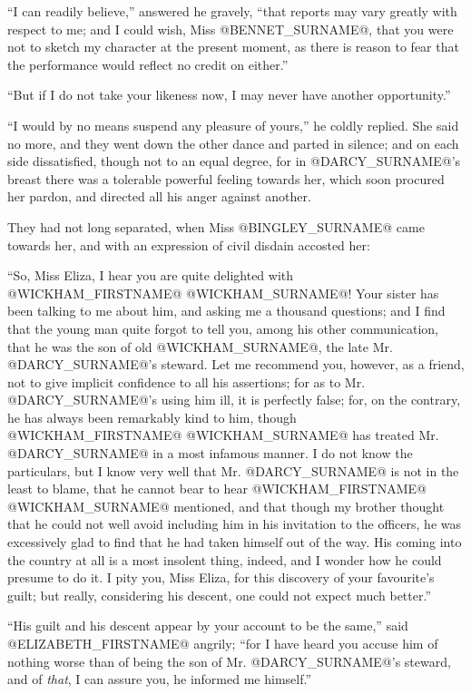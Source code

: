``I can readily believe,'' answered he gravely, ``that reports may vary
greatly with respect to me; and I could wish, Miss @BENNET_SURNAME@, that you were
not to sketch my character at the present moment, as there is reason to
fear that the performance would reflect no credit on either.''

``But if I do not take your likeness now, I may never have another
opportunity.''

``I would by no means suspend any pleasure of yours,'' he coldly replied.
She said no more, and they went down the other dance and parted in
silence; and on each side dissatisfied, though not to an equal degree,
for in @DARCY_SURNAME@'s breast there was a tolerable powerful feeling towards
her, which soon procured her pardon, and directed all his anger against
another.

They had not long separated, when Miss @BINGLEY_SURNAME@ came towards her, and
with an expression of civil disdain accosted her:

``So, Miss Eliza, I hear you are quite delighted with @WICKHAM_FIRSTNAME@ @WICKHAM_SURNAME@!
Your sister has been talking to me about him, and asking me a thousand
questions; and I find that the young man quite forgot to tell you, among
his other communication, that he was the son of old @WICKHAM_SURNAME@, the late
Mr. @DARCY_SURNAME@'s steward. Let me recommend you, however, as a friend, not to
give implicit confidence to all his assertions; for as to Mr. @DARCY_SURNAME@'s
using him ill, it is perfectly false; for, on the contrary, he has
always been remarkably kind to him, though @WICKHAM_FIRSTNAME@ @WICKHAM_SURNAME@ has treated
Mr. @DARCY_SURNAME@ in a most infamous manner. I do not know the particulars, but
I know very well that Mr. @DARCY_SURNAME@ is not in the least to blame, that he
cannot bear to hear @WICKHAM_FIRSTNAME@ @WICKHAM_SURNAME@ mentioned, and that though my brother
thought that he could not well avoid including him in his invitation to
the officers, he was excessively glad to find that he had taken himself
out of the way. His coming into the country at all is a most insolent
thing, indeed, and I wonder how he could presume to do it. I pity you,
Miss Eliza, for this discovery of your favourite's guilt; but really,
considering his descent, one could not expect much better.''

``His guilt and his descent appear by your account to be the same,'' said
@ELIZABETH_FIRSTNAME@ angrily; ``for I have heard you accuse him of nothing worse
than of being the son of Mr. @DARCY_SURNAME@'s steward, and of \textit{that}, I can
assure you, he informed me himself.''

